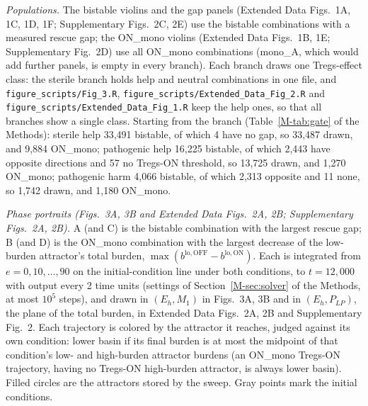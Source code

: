 \documentclass[11pt]{article}
\begin{document}
\emph{Populations.} The bistable violins and the gap panels (Extended Data Figs.~1A, 1C, 1D, 1F; Supplementary Figs.~2C, 2E) use the bistable combinations with a measured rescue
gap; the ON\_mono violins (Extended Data Figs.~1B, 1E; Supplementary Fig.~2D) use all ON\_mono combinations (mono\_A, which would add further panels,
is empty in every branch). Each branch draws one Tregs-effect class: the sterile branch
holds help and neutral combinations in one file, and \texttt{figure\_scripts/Fig\_3.R}, \texttt{figure\_scripts/Extended\_Data\_Fig\_2.R} and
\texttt{figure\_scripts/Extended\_Data\_Fig\_1.R} keep the
help ones, so that all branches show a single class. Starting from the branch
(Table~\ref{M-tab:gate} of the Methods): sterile help 33,491 bistable, of which 4 have no gap, so 33,487
drawn, and 9,884 ON\_mono; pathogenic
help 16,225 bistable, of which 2,443 have opposite directions and 57 no Tregs-ON
threshold, so 13,725 drawn, and 1,270 ON\_mono; pathogenic harm 4,066 bistable, of which
2,313 opposite and 11 none, so 1,742 drawn, and 1,180 ON\_mono.

\emph{Phase portraits (Figs.~3A, 3B and Extended Data Figs.~2A, 2B; Supplementary Figs.~2A, 2B).} A (and C) is the bistable combination with the largest rescue gap;
B (and D) is the ON\_mono combination with the largest decrease of the low-burden attractor's total burden,
$\max(b^{\mathrm{lo,OFF}} - b^{\mathrm{lo,ON}})$. Each is integrated from
$e = 0, 10, \dots, 90$ on the initial-condition line under both conditions, to
$t = 12{,}000$ with output every 2 time units (settings of
Section~\ref{M-sec:solver} of the Methods, at most $10^5$ steps), and drawn in $(E_h, M_1)$ in
Figs.~3A, 3B and in $(E_h, P_{LP})$, the plane of the total burden, in Extended Data Figs.~2A, 2B and Supplementary Fig.~2.
Each trajectory is colored by the attractor it reaches, judged against its own
condition: lower basin if its final burden is at most the midpoint of that
condition's low- and high-burden attractor burdens (an ON\_mono Tregs-ON trajectory,
having no Tregs-ON high-burden attractor, is always lower basin). Filled circles are the
attractors stored by the sweep. Gray points mark the initial conditions.
\end{document}
